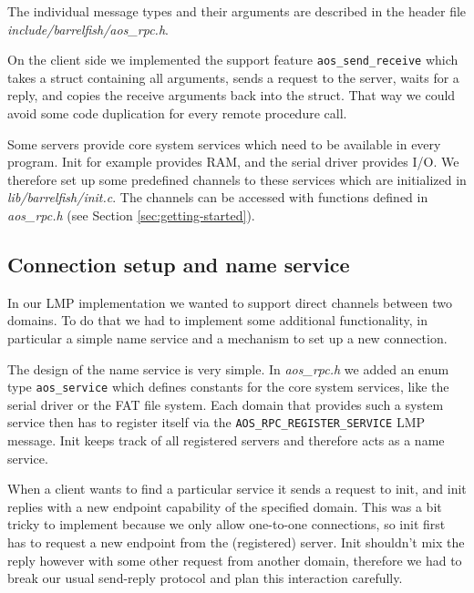\documentclass[a4paper,10pt]{article}
\newcommand{\filepath}[1]{\emph{ #1}}
\begin{document}
The individual message types and their arguments are described in the header file \filepath{include/barrelfish/aos\_rpc.h}.

On the client side we implemented the support feature \lstinline!aos_send_receive! which takes a struct containing all arguments, 
sends a request to the server, waits for a reply, and copies the receive arguments back into the struct.
That way we could avoid some code duplication for every remote procedure call.

Some servers provide core system services which need to be available in every program.
Init for example provides RAM, and the serial driver provides I/O.
We therefore set up some predefined channels to these services which are initialized in \filepath{lib/barrelfish/init.c}.
The channels can be accessed with functions defined in \filepath{aos\_rpc.h} (see Section \ref{sec:getting-started}).

\subsection{Connection setup and name service}

In our LMP implementation we wanted to support direct channels between two domains.
To do that we had to implement some additional functionality, in particular a simple name service and a mechanism to set up a new connection.

The design of the name service is very simple.
In \filepath{aos\_rpc.h} we added an enum type \lstinline!aos_service! which defines constants for the core system services, like the serial driver or the FAT file system.
Each domain that provides such a system service then has to register itself via the \lstinline!AOS_RPC_REGISTER_SERVICE! LMP message.
Init keeps track of all registered servers and therefore acts as a name service.

When a client wants to find a particular service it sends a request to init, and init replies with a new endpoint capability of the specified domain.
This was a bit tricky to implement because we only allow one-to-one connections, so init first has to request a new endpoint from the (registered) server.
Init shouldn't mix the reply however with some other request from another domain, therefore we had to break our usual send-reply protocol and plan this interaction carefully.
\end{document}
